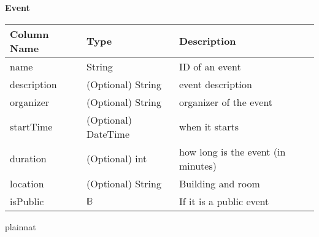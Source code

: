 \documentclass[12pt, titlepage]{article}
\begin{document}
\textbf{Event}
\begin{table}[H]
	\begin{tabular}{|p{}|p{}|p{}|}
		\hline
		\textbf{Column Name} & \textbf{Type}  & \textbf{Description}                  \\
		\hline
		name                   & String                & ID of an event\\
		\hline
		description           & (Optional) String     & event description \\
		\hline
		organizer           & (Optional) String      & organizer of the event       \\
		\hline
		startTime            & (Optional) DateTime               & when it starts  \\
		\hline
		duration            & (Optional) int               & how long is the event (in minutes)  \\
		\hline
		location             & (Optional) String                & Building and room                 \\
		\hline
		isPublic             & $\mathbb{B}$                & If it is a public event                \\
		\hline
\end{tabular}
\end{table}
\newpage
 {plainnat}

\end{document}
